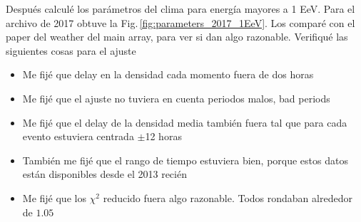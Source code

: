       Después calculé los parámetros del clima para energía mayores a 1 EeV. Para el archivo de 2017 obtuve la Fig.\,\ref{fig:parameters_2017_1EeV}. Los comparé con el paper del weather del main array, para ver si dan algo razonable. Verifiqué las siguientes cosas para el ajuste

      \begin{itemize}
        \item Me fijé que delay en la densidad cada momento fuera de dos  horas
        \item Me fijé que el ajuste no tuviera en cuenta periodos malos, bad periods
        \item Me fijé que el delay de la densidad media también fuera tal que para cada evento estuviera centrada $\pm$12 horas
        \item También me fijé que el rango de tiempo estuviera bien, porque estos datos están disponibles desde el 2013  recién
        \item Me fijé que los $\chi^2$ reducido fuera algo razonable. Todos rondaban alrededor de $1.05$
      \end{itemize}

